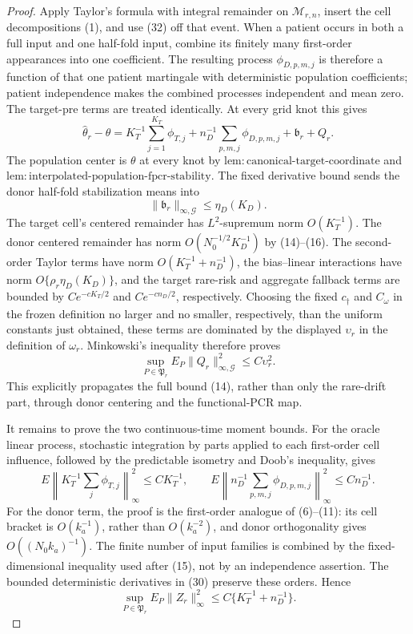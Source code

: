 \documentclass{article}
\begin{document}
\begin{proof}
Apply Taylor's formula with integral remainder on
\(\mathcal M_{r,n}\), insert the cell decompositions (1), and use (32)
off that event.  When a patient occurs in both a full input and one half-fold
input, combine its finitely many first-order appearances into one coefficient.
The resulting process \(\phi_{D,p,m,j}\) is therefore a function of that one
patient martingale with deterministic population coefficients; patient
independence makes the combined processes independent and mean zero.  The
target-pre terms are treated identically.  At every grid knot this gives
\[
 \widehat\theta_r-\theta
 =K_T^{-1}\sum_{j=1}^{K_T}\phi_{T,j}
 +n_D^{-1}\sum_{p,m,j}\phi_{D,p,m,j}
 +\mathfrak b_r+Q_r.                                   \tag{33}
\]
The population center is \(\theta\) at every knot by
\(\mathrm{lem:canonical\mbox{-}target\mbox{-}coordinate}\) and
\(\mathrm{lem:interpolated\mbox{-}population\mbox{-}fpcr\mbox{-}stability}\).
The fixed derivative bound sends the donor half-fold stabilization means into
\[
 \|\mathfrak b_r\|_{\infty,\mathcal G}\leq\eta_D(K_D). \tag{34}
\]
The target cell's centered remainder has \(L^2\)-supremum norm
\(O(K_T^{-1})\).  The donor centered remainder has norm
\(O(N_0^{-1/2}K_D^{-1})\) by (14)--(16).  The second-order Taylor terms have
norm \(O(K_T^{-1}+n_D^{-1})\), the bias--linear interactions have norm
\(O\{\rho_r\eta_D(K_D)\}\), and the target rare-risk and aggregate fallback
terms are bounded by \(Ce^{-cK_T/2}\) and \(Ce^{-cn_D/2}\), respectively.
Choosing the fixed \(c_\dagger\) and \(C_\omega\) in the frozen definition
no larger and no smaller, respectively, than the uniform constants just
obtained, these terms are dominated by the displayed \(\upsilon_r\) in the
definition of \(\omega_r\).  Minkowski's inequality therefore proves
\[
 \sup_{P\in\mathfrak P_r}E_P
 \|Q_r\|_{\infty,\mathcal G}^2\leq C\upsilon_r^2.      \tag{35}
\]
This explicitly propagates the full bound (14), rather than only the
rare-drift part, through donor centering and the functional-PCR map.

It remains to prove the two continuous-time moment bounds.  For the oracle
linear process, stochastic integration by parts applied to each first-order
cell influence, followed by the predictable isometry and Doob's inequality,
gives
\[
 E\left\|K_T^{-1}\sum_j\phi_{T,j}\right\|_\infty^2
 \leq C K_T^{-1},
 \qquad
 E\left\|n_D^{-1}\sum_{p,m,j}\phi_{D,p,m,j}\right\|_\infty^2
 \leq C n_D^{-1}.                                      \tag{36}
\]
For the donor term, the proof is the first-order analogue of (6)--(11): its
cell bracket is \(O(k_a^{-1})\), rather than \(O(k_a^{-2})\), and donor
orthogonality gives \(O((N_0k_a)^{-1})\).  The finite number of input
families is combined by the fixed-dimensional inequality used after (15),
not by an independence assertion.  The bounded deterministic derivatives in
(30) preserve these orders.  Hence
\[
 \sup_{P\in\mathfrak P_r}E_P\|Z_r\|_\infty^2
 \leq C\{K_T^{-1}+n_D^{-1}\}.                          \tag{37}
\]


\end{proof}
\end{document}
